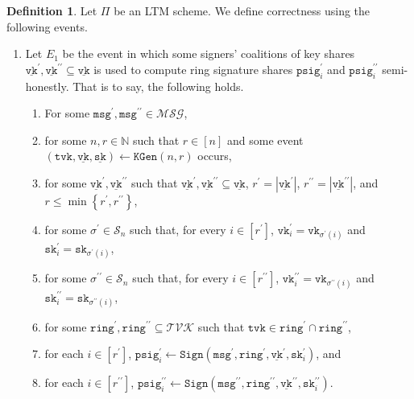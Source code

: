 \documentclass[11pt]{article}
\theoremstyle{definition}
\newtheorem{definition}[definition]{Definition}
\newcommand{\sk}{\texttt{sk}}
\newcommand{\vk}{\texttt{vk}}
\newcommand{\tvk}{\texttt{tvk}}
\newcommand{\ring}{\texttt{ring}}
\newcommand{\SK}{\underline{\texttt{sk}}}
\newcommand{\VK}{\underline{\texttt{vk}}}
\newcommand{\psig}{\texttt{psig}}
\newcommand{\bbn}{\mathbb{N}}
\newcommand{\msg}{\texttt{msg}}
\newcommand{\keygen}{\texttt{KGen}}
\newcommand{\keygenIshort}{(n,r)}
\newcommand{\sign}{\texttt{Sign}}
\begin{document}
\begin{definition}\label{def:correctness}
Let $\Pi$ be an LTM scheme. We define correctness using the following events.
\begin{enumerate}
\item Let $E_1$ be the event in which some signers' coalitions of key shares $\VK^\prime, \VK^{\prime \prime} \subseteq \VK$ is used to compute ring signature shares $\psig_i^\prime$ and $\psig_i^{\prime \prime}$ semi-honestly. That is to say, the following holds.
\begin{enumerate}
\item For some $\msg^\prime, \msg^{\prime \prime} \in \mathcal{MSG}$,
\item for some $n, r \in \bbn$ such that  $r \in [n]$ and some event $(\tvk, \VK,  \SK) \leftarrow \keygen\keygenIshort$ occurs, 
\item for some $\VK^\prime, \VK^{\prime \prime}$
such that $\VK^\prime, \VK^{\prime \prime} \subseteq \VK$, $r^\prime = \left|\VK^\prime\right|$, $r^{\prime \prime} = \left|\VK^{\prime \prime}\right|$, and  $r \leq \min\left\{r^\prime, r^{\prime \prime}\right\}$,
\item for some $\sigma^\prime \in \mathcal{S}_n$ such that, for every $i \in [r^\prime]$, $\vk^{\prime}_i = \vk_{\sigma^\prime(i)}$ and  $\sk^\prime_i = \sk_{\sigma^\prime(i)}$,
\item for some $\sigma^{\prime\prime} \in \mathcal{S}_n$ such that, for every $i \in [r^{\prime \prime}]$, $\vk^{\prime\prime}_i = \vk_{\sigma^{\prime\prime}(i)}$ and  $\sk^{\prime\prime}_i = \sk_{\sigma^{\prime\prime}(i)}$,
\item for some $\ring^\prime, \ring^{\prime \prime} \subseteq \mathcal{TVK}$ such that $\tvk \in \ring^{\prime} \cap \ring^{\prime \prime}$,

\item for each $i \in [r^\prime]$, $\psig_i^\prime \leftarrow \sign(\msg^\prime, \ring^\prime, \VK^\prime,  \sk^\prime_i)$, and
\item for each $i \in [r^{\prime \prime}]$, $\psig_i^{\prime\prime} \leftarrow \sign(\msg^{\prime\prime}, \ring^{\prime \prime}, \VK^{\prime\prime},  \sk^{\prime \prime}_i)$.
\end{enumerate}


\end{enumerate}
\end{definition}
\end{document}

